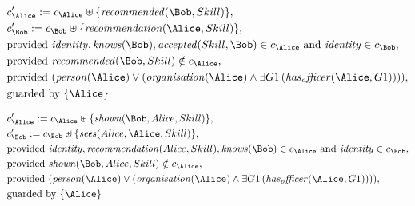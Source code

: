 \begin{align*}
&
c'_
{
\Alice
}
 := 
c_
{
\Alice
}
 \uplus 
\{
\mathit{
recommended
}
(
\Bob
,
Skill
)
\}
,\\
&
c'_
{
\Bob
}
 := 
c_
{
\Bob
}
 \uplus 
\{
\mathit{
recommendation
}
(
\Alice
,
Skill
)
\}
,\\
&
\text{provided } 
\mathit{
identity
}
,
\mathit{
knows
}
(
\Bob
)
,
\mathit{
accepted
}
(
Skill
,
\Bob
)
 \in c_
{
\Alice
}
 \text{ and } 
\mathit{
identity
}
 \in c_
{
\Bob
}
,\\
&
\text{provided } 
\mathit{
recommended
}
(
\Bob
,
Skill
)
 \notin c_
{
\Alice
}
,\\
&
\text{provided } 
(
\mathit{
person
}
(
\Alice
)
\lor
(
\mathit{
organisation
}
(
\Alice
)
\land
\exists 
G1
\,(
\mathit{
has_officer
}
(
\Alice
,
G1
)
)
)
)
,\\
&
\text{guarded by } \{
\Alice
\}
\end{align*}

\begin{align*}
&
c'_
{
\Alice
}
 := 
c_
{
\Alice
}
 \uplus 
\{
\mathit{
shown
}
(
\Bob
,
Alice
,
Skill
)
\}
,\\
&
c'_
{
\Bob
}
 := 
c_
{
\Bob
}
 \uplus 
\{
\mathit{
sees
}
(
Alice
,
\Alice
,
Skill
)
\}
,\\
&
\text{provided } 
\mathit{
identity
}
,
\mathit{
recommendation
}
(
Alice
,
Skill
)
,
\mathit{
knows
}
(
\Bob
)
 \in c_
{
\Alice
}
 \text{ and } 
\mathit{
identity
}
 \in c_
{
\Bob
}
,\\
&
\text{provided } 
\mathit{
shown
}
(
\Bob
,
Alice
,
Skill
)
 \notin c_
{
\Alice
}
,\\
&
\text{provided } 
(
\mathit{
person
}
(
\Alice
)
\lor
(
\mathit{
organisation
}
(
\Alice
)
\land
\exists 
G1
\,(
\mathit{
has_officer
}
(
\Alice
,
G1
)
)
)
)
,\\
&
\text{guarded by } \{
\Alice
\}
\end{align*}

